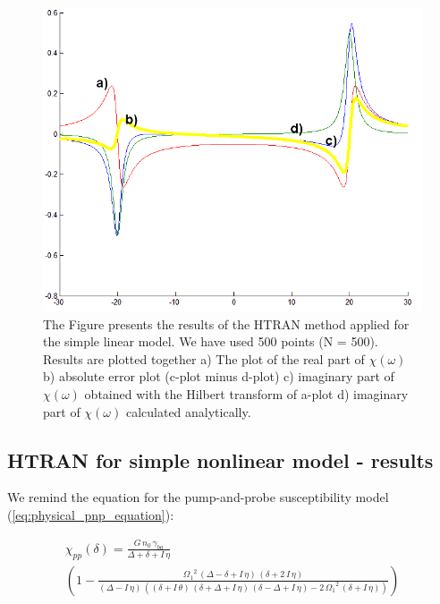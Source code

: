 \documentclass[12pt,twoside,a4paper]{article}
\numberwithin{equation}{subsection}
\numberwithin{figure}{subsection}
\begin{document}
\begin{figure} 
  \includegraphics[width=150mm]{img/htran_lin.png}
  \caption{The Figure presents the results of the HTRAN method applied for the simple linear model. We have used 500 points (N = 500). Results are plotted together 
   a) The plot of the real part of $\chi (\omega )$ 
   b) absolute error plot (c-plot minus d-plot) 
   c) imaginary part of $\chi (\omega )$ obtained with the Hilbert transform of a-plot 
   d) imaginary part of $\chi (\omega )$ calculated analytically. \label{eq:htran_lin}
  }
\end{figure}

\subsection{HTRAN for simple nonlinear model - results} \label{chap:htran_nlo}

We remind the equation for the pump-and-probe susceptibility model (\ref{eq:physical_pnp_equation}): 

\begin{multline} \label{eq:htran_fparameters}
  \chi_{pp} (\delta ) = \frac {G\,{n_{0}}\,{\gamma_{ba}}}{\Delta + \delta + I\,\eta } \\
    \left(  
    	1 - \frac{{\Omega_{1}}^{2}\,(\Delta - \delta + I \, \eta ) \, (\delta + 2 \, I \, \eta )}
    	         {(\Delta  - I \, \eta) \, ((\delta + I \, \theta ) \, (\delta + \Delta + I \, \eta ) 
    	           \, (\delta - \Delta  + I\,\eta ) - 2 \, {\Omega_{1}}^{2} \, (\delta  + I \, \eta ))} 
    \right) 
\end{multline}
\end{document}
